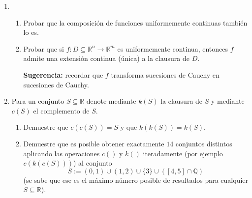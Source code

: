 \documentclass[11pt]{article}
\newcommand{\R}{\mathbb{R}}
\begin{document}
\begin{enumerate}
\item \begin{enumerate}

 
     \item Probar que la composici\'on de funciones uniformemente 
           continuas tambi\'en lo es.
     \item Probar que si $f:D\subseteq\R^n\to\R^m$ es
           uniformemente 
           continua, entonces $f$ admite una extensi\'on continua
           (\'unica) a la clausura de $D$. 
           
           {\bf Sugerencia:} recordar que $f$ transforma
           sucesiones de Cauchy en sucesiones de Cauchy.
      \end{enumerate}
        

\item Para un conjunto $S\subseteq \mathbb{R}$ denote mediante $k(S)$ la clausura de $S$ y mediante $c(S)$ el complemento de $S$.
\begin{enumerate}
\item Demuestre que $c(c(S))=S$ y que $k(k(S))=k(S)$.
\item Demuestre que es posible obtener exactamente $14$ conjuntos distintos aplicando las operaciones $c()$ y $k()$ iteradamente (por ejemplo $c(k(c(S)))$) al 
conjunto 
\[S:=(0,1)\cup (1,2)\cup \{3\}\cup \left([4,5]\cap \mathbb{Q}\right)\]
(se sabe que ese es el máximo número posible de resultados para cualquier $S\subseteq \mathbb{R
}$).


\end{enumerate}


        
\end{enumerate}
\end{document}
